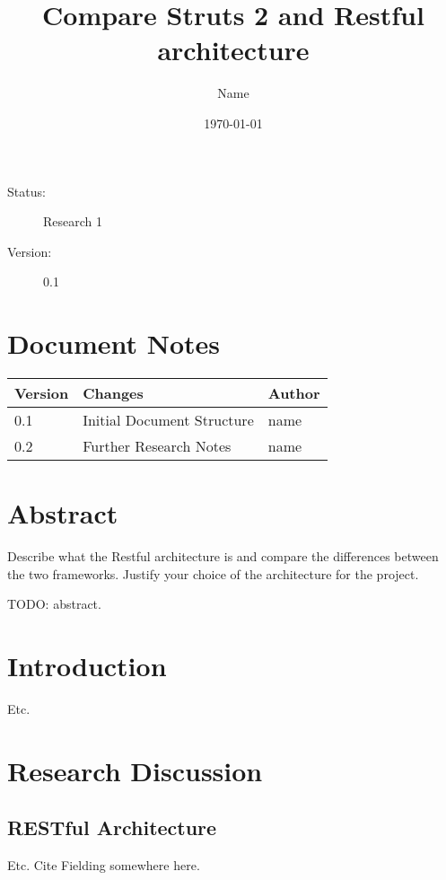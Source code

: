 \documentclass[]{scrartcl}
\title{Compare Struts 2 and Restful architecture}
\author{Name}
\date{\today}
\begin{document}
\maketitle
\vfill
	{\large
		\begin{description}
			\item [Status:] Research 1
			\item [Version:] 0.1
		\end{description}
	}

	\clearpage
	\tableofcontents
	\vfill
	
	\section{Document Notes} {
		\begin{tabular}{ p{} | p{} | p{} }
			\textbf{Version} & \textbf{Changes} & \textbf{Author} \\
			\hline

			0.1 &
			Initial Document Structure &
			name \\
			\hline

			0.2 &
			Further Research Notes &
			name \\
			\hline
		\end{tabular}
	}	
	\clearpage

	\section{Abstract} {
		
		\begin{tcolorbox}[	tab1,
						title= PBL Report - Topic 2,
						boxrule=0.5pt	]
			Describe what the Restful architecture is and compare the differences between the two frameworks. Justify your choice of the architecture for the project.
		\end{tcolorbox}
		
		TODO: abstract.
	}
	\clearpage
	
	\section{Introduction} {
		Etc.
	}
	\clearpage
	
	\section{Research Discussion}
		\subsection{RESTful Architecture} {
			Etc. Cite Fielding somewhere here. \cite{fielding2000}
		}
		\clearpage
		
\end{document}
